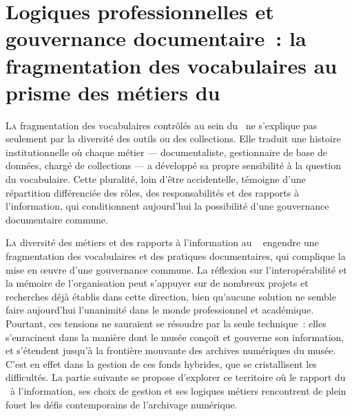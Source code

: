 \chapter[Diversité des métiers et fragmentation documentaire]{\label{II-B}Logiques professionnelles et gouvernance documentaire~: la fragmentation des vocabulaires au prisme des métiers du \mae}

\lettrine{L}a fragmentation des vocabulaires contrôlés au sein du \maelong~ne s'explique pas seulement par la diversité des outils ou des collections. Elle traduit une histoire institutionnelle où chaque métier — documentaliste, gestionnaire de base de données, chargé de collections — a développé sa propre sensibilité à la question du vocabulaire. Cette pluralité, loin d'être accidentelle, témoigne d'une répartition différenciée des rôles, des responsabilités et des rapports à l'information, qui conditionnent aujourd'hui la possibilité d'une gouvernance documentaire commune.




\bigskip
\bigskip
\bigskip

\lettrine{L}{a} diversité des métiers et des rapports à l'information au \mae~ engendre une fragmentation des vocabulaires et des pratiques documentaires, qui complique la mise en œuvre d'une gouvernance commune. La réflexion sur l'interopérabilité et la mémoire de l'organisation peut s'appuyer sur de nombreux projets et recherches déjà établis dans cette direction, bien qu'aucune solution ne semble faire aujourd'hui l'unanimité dans le monde professionnel et académique. Pourtant, ces tensions ne sauraient se résoudre par la seule technique~: elles s’enracinent dans la manière dont le musée conçoit et gouverne son information, et s’étendent jusqu’à la frontière mouvante des archives numériques du musée. C’est en effet dans la gestion de ces fonds hybrides, que se cristallisent les difficultés. La partie suivante se propose d’explorer ce territoire où le rapport du \mae~à l’information, ses choix de gestion et ses logiques métiers rencontrent de plein fouet les défis contemporains de l’archivage numérique.